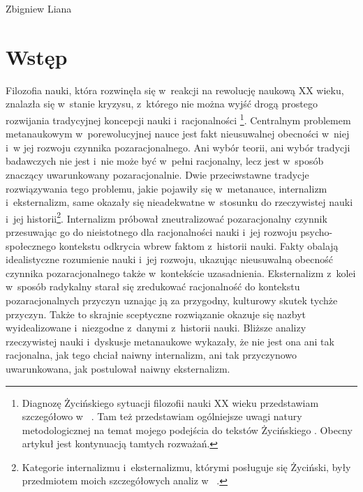 \begin{artplenv}{Zbigniew Liana}
\section{Wstęp}
\lettrine[loversize=0.13,lines=2,lraise=-0.01,nindent=0em,findent=0.2pt]%
{F}{}ilozofia nauki, która rozwinęła się w~reakcji na rewolucję naukową XX wieku, znalazła się w~stanie kryzysu, z~którego nie można wyjść drogą prostego rozwijania tradycyjnej koncepcji nauki i~racjonalności
\parencites[][s.~199]{zycinski_teizm_1985}[][s.~145]{zycinski_structure_1988}[][s.~189]{zycinski_elementy_1996}%
\footnote{Diagnozę Życińskiego sytuacji filozofii nauki XX wieku przedstawiam szczegółowo w~
\parencite[][]{liana_nauka_2019_liana}. %
 Tam też przedstawiam ogólniejsze uwagi natury metodologicznej na temat mojego podejścia do tekstów Życińskiego 
\parencite[][s.~148–152]{liana_nauka_2019_liana}. %
 Obecny artykuł jest kontynuacją tamtych rozważań.}. Centralnym problemem metanaukowym w~porewolucyjnej nauce jest fakt nieusuwalnej obecności w~niej i~w jej rozwoju czynnika pozaracjonalnego. Ani wybór teorii, ani wybór tradycji badawczych nie jest i~nie może być w~pełni racjonalny, lecz jest w~sposób znaczący uwarunkowany pozaracjonalnie. Dwie przeciwstawne tradycje rozwiązywania tego problemu, jakie pojawiły się w~metanauce, internalizm i~eksternalizm, same okazały się nieadekwatne w~stosunku do rzeczywistej nauki i~jej historii\footnote{Kategorie internalizmu i~eksternalizmu, którymi posługuje się Życiński, były przedmiotem moich szczegółowych analiz w~
\parencite[][]{liana_nauka_2019_liana}.%
}. Internalizm próbował zneutralizować pozaracjonalny czynnik przesuwając go do nieistotnego dla racjonalności nauki i~jej rozwoju psycho-społecznego kontekstu odkrycia wbrew faktom z~historii nauki. Fakty obalają idealistyczne rozumienie nauki i~jej rozwoju, ukazując nieusuwalną obecność czynnika pozaracjonalnego także w~kontekście uzasadnienia. Eksternalizm z~kolei w~sposób radykalny starał się zredukować racjonalność do kontekstu pozaracjonalnych przyczyn uznając ją za przygodny, kulturowy skutek tychże przyczyn. Także to skrajnie sceptyczne rozwiązanie okazuje się nazbyt wyidealizowane i~niezgodne z~danymi z~historii nauki. Bliższe analizy rzeczywistej nauki i~dyskusje metanaukowe wykazały, że nie jest ona ani tak racjonalna, jak tego chciał naiwny internalizm, ani tak przyczynowo uwarunkowana, jak postulował naiwny eksternalizm.


\end{artplenv}
